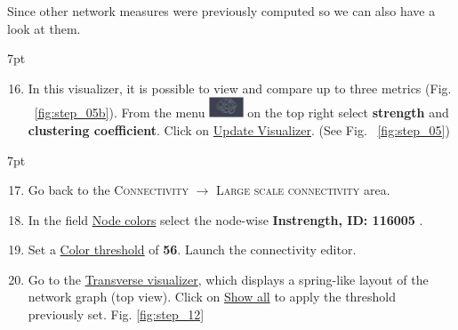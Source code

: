\documentclass{tufte-handout}
\newenvironment{formal}{%
  \def\FrameCommand{%
    \hspace{1pt}%
    {\color{DarkBlue}\vrule width 2pt}%
    {\color{formalshade}\vrule width 4pt}%
    \colorbox{formalshade}%
  }%
  \MakeFramed{\advance\hsize-\width\FrameRestore}%
  \noindent\hspace{-4.55pt}%
  \begin{adjustwidth}{}{7pt}%
  \vspace{2pt}\vspace{2pt}%
}
{%
  \vspace{2pt}\end{adjustwidth}\endMakeFramed%
}
\begin{document}
\noindent Since other network measures were previously computed so we can also have a look at them. 
\begin{formal}
  \begin{enumerate}[resume] %
  \setcounter{enumi}{15}
  \item In this visualizer, it is possible to view and compare up to three metrics (Fig. ~\ref{fig:step_05b}). From the menu \includegraphics[width=0.08\textwidth]{butt_brain_menu} on the top right select \textbf{strength} and \textbf{clustering coefficient}. Click on \underline{Update Visualizer}. (See Fig. ~\ref{fig:step_05})
  \end{enumerate}
\end{formal}

\begin{formal}
  \begin{enumerate}[resume] %
  \setcounter{enumi}{16}
  \item Go back to the \textsc{Connectivity} $\rightarrow$ \textsc{Large scale connectivity} area. 
  \item  In the field \underline{Node colors} select
the node-wise \textbf{Instrength, ID: 116005} .
\item Set a \underline{Color threshold} of \textbf{56}. Launch the connectivity editor.
  \item Go to the \underline{Transverse visualizer}, which displays a spring-like layout of the network graph (top view). Click on \underline{Show all} to apply the threshold previously set. Fig. \ref{fig:step_12}
  \end{enumerate}
\end{formal}
\end{document}
